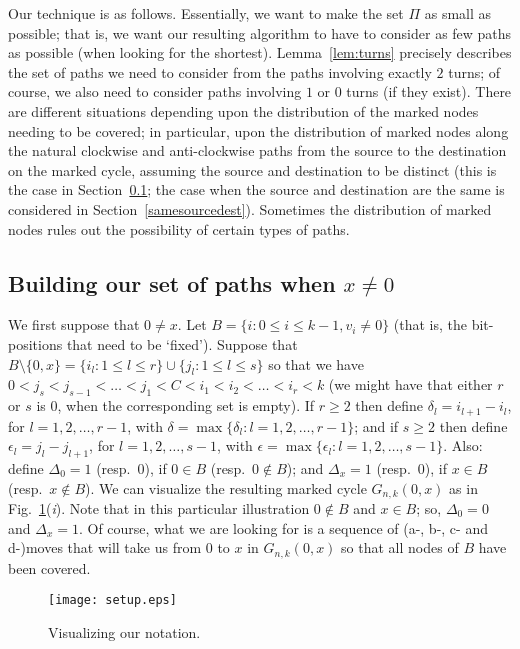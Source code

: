 \documentclass{article}
\newcounter{fig}
\begin{document}
Our technique is as follows. Essentially, we want to make the set $\Pi$ as small as possible; that is, we want our resulting algorithm to have to consider as few paths as possible (when looking for the shortest). Lemma~\ref{lem:turns} precisely describes the set of paths we need to consider from the paths involving exactly $2$ turns; of course, we also need to consider paths involving $1$ or $0$ turns (if they exist). There are different situations depending upon the distribution of the marked nodes needing to be covered; in particular, upon the distribution of marked nodes along the natural clockwise and anti-clockwise paths from the source to the destination on the marked cycle, assuming the source and destination to be distinct (this is the case in Section~\ref{distinctsourcedest}; the case when the source and destination are the same is considered in Section~\ref{samesourcedest}). Sometimes the distribution of marked nodes rules out the possibility of certain types of paths.

\subsection{Building our set of paths when $x \neq 0$}\label{distinctsourcedest}

We first suppose that $0\neq x$. Let $B=\{i: 0\leq i\leq k-1, v_i\neq 0\}$ (that
is, the bit-positions that need to be `fixed'). Suppose that $B\setminus\{0,x\}
= \{i_l: 1 \leq l \leq r\}\cup\{j_l: 1 \leq l \leq s\}$ so that we have $0 < j_s
< j_{s-1} < \ldots < j_1 < C < i_1 < i_2 < \ldots < i_r < k$ (we might have that
either $r$ or $s$ is $0$, when the corresponding set is empty). If $r \geq 2$
then define $\delta_l = i_{l+1}-i_l$, for $l=1,2,\ldots,r-1$, with
$\delta=\max\{\delta_l:l=1,2,\ldots,r-1\}$; and if $s\geq 2$ then define
$\epsilon_l = j_l-j_{l+1}$, for $l=1,2,\ldots,s-1$, with
$\epsilon=\max\{\epsilon_l:l=1,2,\ldots,s-1\}$. Also: define $\Delta_0 = 1$
(resp.\ $0$), if $0\in B$ (resp.\ $0\not\in B$); and $\Delta_x = 1$ (resp.\
$0$), if $x\in B$ (resp.\ $x\not\in B$). We can visualize the resulting marked
cycle $G_{n,k}(0,x)$ as in Fig.~\ref{setup}(\emph{i\/}). Note that in this
particular illustration $0\not \in B$ and $x\in B$; so, $\Delta_0=0$ and
$\Delta_x=1$. Of course, what we are looking for is a sequence of (a-, b-, c-
and d-)moves that will take us from $0$ to $x$ in $G_{n,k}(0,x)$ so that all
nodes of $B$ have been covered.

\begin{figure}[t]
\centering
\texttt{[image: setup.eps]}
\caption{Visualizing our notation.}\label{setup}
\end{figure}
\end{document}
